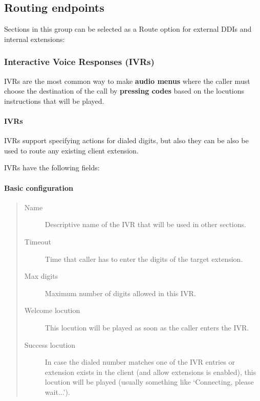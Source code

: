 \documentclass[letterpaper,10pt,spanish]{sphinxmanual}
\begin{document}
\subsection{Routing endpoints}
\label{administration_portal/client/vpbx/routing_endpoints/index:routing-endpoints}\label{administration_portal/client/vpbx/routing_endpoints/index::doc}
Sections in this group can be selected as a Route option for external DDIs and internal extensions:


\subsubsection{Interactive Voice Responses (IVRs)}
\label{administration_portal/client/vpbx/routing_endpoints/ivrs:interactive-voice-responses-ivrs}\label{administration_portal/client/vpbx/routing_endpoints/ivrs::doc}
IVRs are the most common way to make \textbf{audio menus} where the caller must
choose the destination of the call by \textbf{pressing codes} based on the locutions
instructions that will be played.


\paragraph{IVRs}
\label{administration_portal/client/vpbx/routing_endpoints/ivrs:ivrs}\label{administration_portal/client/vpbx/routing_endpoints/ivrs:id1}
IVRs support specifying actions for dialed digits, but also they can be also be used
to route any existing client extension.

IVRs have the following fields:


\paragraph{Basic configuration}
\label{administration_portal/client/vpbx/routing_endpoints/ivrs:basic-configuration}\begin{quote}
\begin{description}
\item[{Name}] \leavevmode
Descriptive name of the IVR that will be used in other sections.

\item[{Timeout}] \leavevmode
Time that caller has to enter the digits of the target extension.

\item[{Max digits}] \leavevmode
Maximum number of digits allowed in this IVR.

\item[{Welcome locution}] \leavevmode
This locution will be played as soon as the caller enters the IVR.

\item[{Success locution}] \leavevmode
In case the dialed number matches one of the IVR entries or extension
exists in the client (and allow extensions is enabled), this locution
will be played (usually something like `Connecting, please wait...').

\end{description}
\end{quote}
\end{document}
